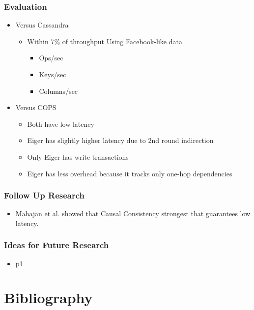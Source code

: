 \documentclass{beamer}
\begin{document}
\begin{frame}
\frametitle{Evaluation}
\begin{itemize}
\pause \item Versus Cassandra
		\begin{itemize}
			\item Within 7\% of throughput Using Facebook-like data
			\begin{itemize}
				\item Ops/sec
				\item Keys/sec
				\item Columns/sec
			\end{itemize}
		\end{itemize}
\pause \item Versus COPS
		\begin{itemize}	
			\item Both have low latency
			\item Eiger has slightly higher latency due to 2nd round indirection
			\item Only Eiger has write transactions
			\item Eiger has less overhead because it tracks only one-hop dependencies
		\end{itemize}
\end{itemize}  
\end{frame}

\begin{frame}
\frametitle{Follow Up Research}
\begin{itemize}
\pause \item Mahajan et al. showed that Causal Consistency strongest that guarantees low latency.
\end{itemize}  
\end{frame}

\begin{frame}
\frametitle{Ideas for Future Research}
\begin{itemize}
\pause \item p1 
\end{itemize}  
\end{frame}



\section{Bibliography} 
\end{document}
